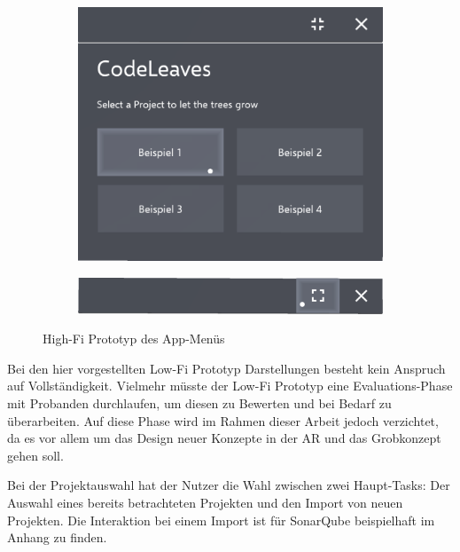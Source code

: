 \begin{figure}[htb]
  \centering
  \begin{subfigure}[t]{\textwidth}
    \centering
    \includegraphics[width=.8\textwidth]{figures/project-selection}
     \label{fig:project-selection}
  \end{subfigure}
  \par\bigskip
  \begin{subfigure}[t]{\textwidth}
    \centering
  	\includegraphics[width=.8\textwidth]{figures/title-bar}
  	 \label{fig:title-bar}
  \end{subfigure}
  \caption{High-Fi Prototyp des App-Menüs} \label{fig:app-menu}
\end{figure}

Bei den hier vorgestellten Low-Fi Prototyp Darstellungen besteht kein Anspruch auf Vollständigkeit. Vielmehr müsste der Low-Fi Prototyp eine Evaluations-Phase mit Probanden durchlaufen, um diesen zu Bewerten und bei Bedarf zu überarbeiten. Auf diese Phase wird im Rahmen dieser Arbeit jedoch verzichtet, da es vor allem um das Design neuer Konzepte in der AR und das Grobkonzept gehen soll.

Bei der Projektauswahl hat der Nutzer die Wahl zwischen zwei Haupt-Tasks: Der Auswahl eines bereits betrachteten Projekten und den Import von neuen Projekten. Die Interaktion bei einem Import ist für SonarQube beispielhaft im Anhang zu finden.

